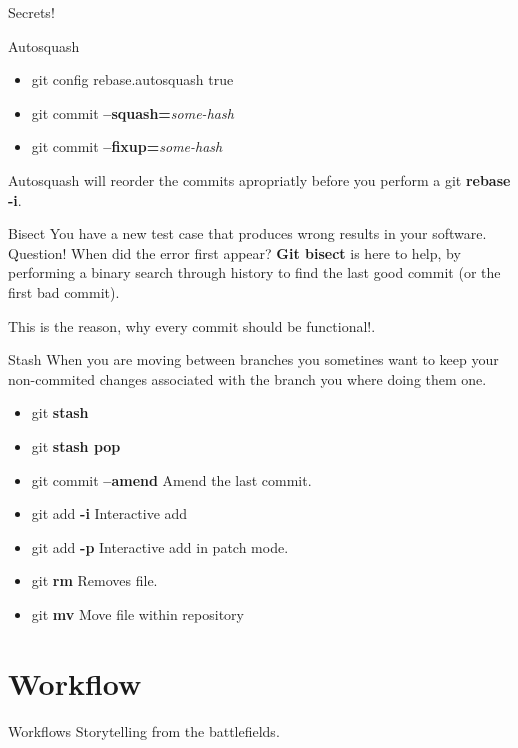 \documentclass{beamer}
\begin{document}
\begin{frame}[allowframebreaks]{Secrets!}
  \begin{block}{Autosquash}
    \begin{itemize}
      \item git config rebase.autosquash true
      \item git commit \textbf{--squash=}\emph{some-hash}
      \item git commit \textbf{--fixup=}\emph{some-hash}
     \end{itemize}
     Autosquash will reorder the commits apropriatly before you perform a git \textbf{rebase -i}.
  \end{block}
  \begin{block}{Bisect}
    You have a new test case that produces wrong results in your software. Question! When did the error first appear? \textbf{Git bisect} is here to help, by performing a binary search through history to find the last good commit (or the first bad commit).

    This is the reason, why every commit should be functional!.
  \end{block}
  \framebreak
  \begin{block}{Stash}
    When you are moving between branches you sometines want to keep your non-commited changes associated with the branch you where doing them one.
    \begin{itemize}
      \item git \textbf{stash}
      \item git \textbf{stash pop}
    \end{itemize}
  \end{block}

  \begin{itemize}
    \item git commit \textbf{--amend} Amend the last commit.
    \item git add \textbf{-i} Interactive add
    \item git add \textbf{-p} Interactive add in patch mode.
    \item git \textbf{rm} Removes file.
    \item git \textbf{mv} Move file within repository
  \end{itemize}
\end{frame}
\section{Workflow}
\begin{frame}{Workflows}
  \centering
  Storytelling from the battlefields.
\end{frame}
\end{document}
